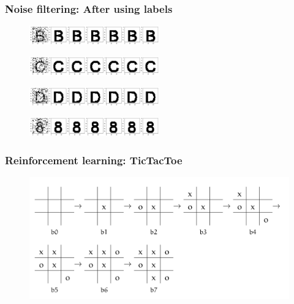 \documentclass{beamer}
\begin{document}
\begin{frame}
\frametitle{Noise filtering: After using labels}
\begin{figure}
\includegraphics[width=0.5\textwidth]{./images02/filter/labelB-20noise.png}
\end{figure}
\begin{figure}
\includegraphics[width=0.5\textwidth]{./images02/filter/labelC-20noise.png}
\end{figure}
\begin{figure}
\includegraphics[width=0.5\textwidth]{./images02/filter/labelD-20noise.png}
\end{figure}
\begin{figure}
\includegraphics[width=0.5\textwidth]{./images02/filter/label8-20noise.png}
\end{figure}
\end{frame}


\begin{frame}
\frametitle{Reinforcement learning: TicTacToe}
\begin{figure}
\centering\includegraphics[width=\textwidth]{./images-defense/ttt-example.png}
\end{figure}
\end{frame}
\end{document}
